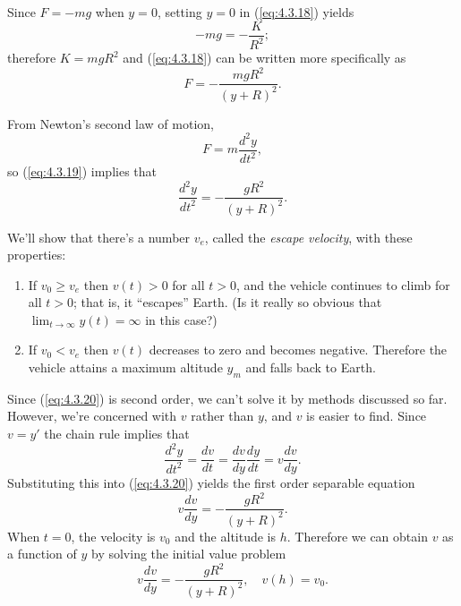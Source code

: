\documentclass{ximera}
\begin{document}
 Since $F=-mg$ when $y=0$, setting $y=0$ in
(\ref{eq:4.3.18}) yields
$$
-mg=-\frac{K}{R^2};
$$
 therefore $K=mgR^2$ and (\ref{eq:4.3.18}) can be written more
specifically as
\begin{equation} \label{eq:4.3.19}
F=-\frac{mgR^2}{(y+R)^2}.
\end{equation}

From Newton's second law of motion,
$$
F=m\frac{d^2y}{dt^2},
$$
so (\ref{eq:4.3.19}) implies that
\begin{equation} \label{eq:4.3.20}
\frac{d^2y}{dt^2}=-\frac{gR^2}{(y+R)^2}.
\end{equation}

We'll show that there's a number $v_e$, called the \textit{escape
velocity}, with these properties:

\begin{enumerate}
\item If $v_0\geq v_e$ then $v(t)>0$ for all $t>0$, and the vehicle
continues to climb for all $t>0$; that is, it ``escapes'' Earth.
(Is it really so obvious that $\lim_{t\rightarrow\infty}y(t)=\infty$
in this case?)
\item  If $v_0<v_e$  then  $v(t)$   decreases to zero and becomes negative.
Therefore
 the vehicle attains a  maximum
altitude  $y_m$ and
falls back to Earth.
 \end{enumerate}

Since
(\ref{eq:4.3.20}) is second order, we can't solve it by methods discussed
so far. However, we're concerned with $v$ rather than $y$, and $v$ is
easier to find. Since $v=y'$ the chain rule implies that
$$
\frac{d^2y}{dt^2}=\frac{dv}{dt}=\frac{dv}{dy}\frac{dy}{dt}=v\frac{dv}{dy}.
$$
 Substituting this into (\ref{eq:4.3.20}) yields the first order
separable equation
\begin{equation} \label{eq:4.3.21}
v\frac{dv}{dy}=-\frac{gR^2}{(y+R)^2}.
\end{equation}
When $t=0$, the velocity is $v_0$ and the altitude is $h$. Therefore
we can
obtain $v$ as a function of $y$ by solving the initial value problem
$$
v\frac{dv}{dy}=-\frac{gR^2}{(y+R)^2},\quad  v(h)=v_0.
$$
\end{document}
